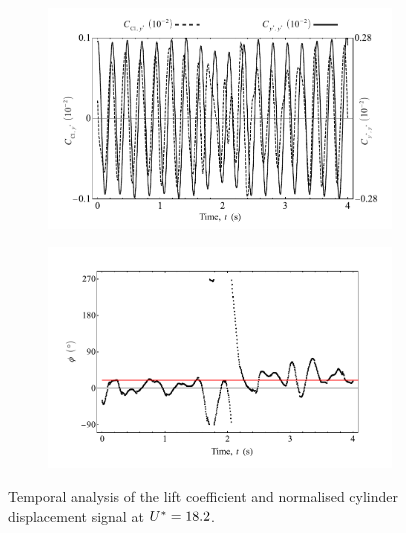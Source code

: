 \documentclass[oneside]{utmthesis}
\begin{document}
\begin{figure}
  \centering
  \begin{subfigure}[h]{1\textwidth}
    \includegraphics[width=\textwidth]{figs/tempAnalysisStableInitialBranch-a}
    \caption{}
    \label{fig:tempAnalysisStableInitialBranch-a}
  \end{subfigure}

  \begin{subfigure}[h]{1\textwidth}
    \includegraphics[width=\textwidth]{figs/tempAnalysisStableInitialBranch-b}
    \caption{}
    \label{fig:tempAnalysisStableInitialBranch-b}
  \end{subfigure}
  \caption{Temporal analysis of the lift coefficient and normalised cylinder displacement signal at $U^{*} = 18.2$.}
\end{figure}
\end{document}
